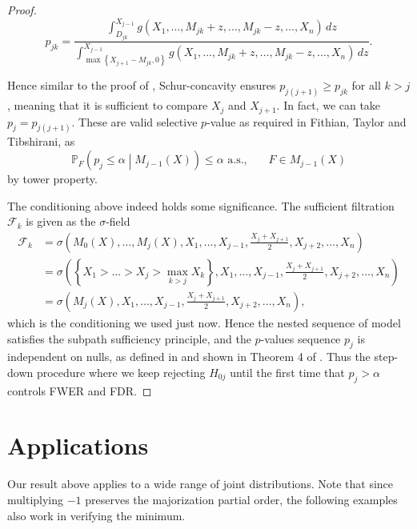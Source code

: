 \documentclass[11pt]{article}
\newcommand{\PP}{\mathbb{P}}
\begin{document}
\begin{proof}
$$p_{jk} = \frac{\int_{D_{jk}}^{X_{j-1}} g\left(X_1, \ldots, M_{jk} + z, \ldots, M_{jk} - z, \ldots, X_n\right) \,dz}{\int_{\max\left\{X_{j+1} - M_{jk}, 0\right\}}^{X_{j-1}} g\left(X_1, \ldots, M_{jk} + z, \ldots, M_{jk} - z, \ldots, X_n\right) \,dz}.$$

Hence similar to the proof of , Schur-concavity ensures $p_{j\left(j+1\right)} \ge p_{jk}$ for all $k>j$, meaning that it is sufficient to compare $X_j$ and $X_{j+1}$. In fact, we can take $p_j = p_{j\left(j+1\right)}$. These are valid selective $p$-value as required in Fithian, Taylor and Tibshirani, as
$$\PP_F \left(p_j \le \alpha \middle| M_{j-1}\left(X\right)\right) \le \alpha \text{ a.s.}, ~~~~~~~~ F \in M_{j-1}\left(X\right)$$
by tower property.

The conditioning above indeed holds some significance. The sufficient filtration \cite{Fithian:2015uj} $\mathscr{F}_k$ is given as the $\sigma$-field
\begin{align*}
\mathscr{F}_k & = \sigma\left(M_0\left(X\right), \ldots, M_j\left(X\right), X_1, \ldots, X_{j-1}, \frac{X_j + X_{j+1}}{2}, X_{j+2}, \ldots, X_n\right) \\
& = \sigma\left(\left\{X_1 > \ldots > X_j > \max_{k>j} X_k\right\}, X_1, \ldots, X_{j-1}, \frac{X_j + X_{j+1}}{2}, X_{j+2}, \ldots, X_n\right) \\
& = \sigma\left(M_j\left(X\right), X_1, \ldots, X_{j-1}, \frac{X_j + X_{j+1}}{2}, X_{j+2}, \ldots, X_n\right),
\end{align*}
which is the conditioning we used just now. Hence the nested sequence of model satisfies the subpath sufficiency principle, and the $p$-values sequence $p_j$ is independent on nulls, as defined in and shown in Theorem 4 of \cite{Fithian:2015uj}. Thus the step-down procedure where we keep rejecting $H_{0j}$ until the first time that $p_j > \alpha$ controls FWER and FDR.

\end{proof}

\section{Applications}
\label{sec:applications}

Our result above applies to a wide range of joint distributions. Note that since multiplying $-1$ preserves the majorization partial order, the following examples also work in verifying the minimum.
\end{document}
